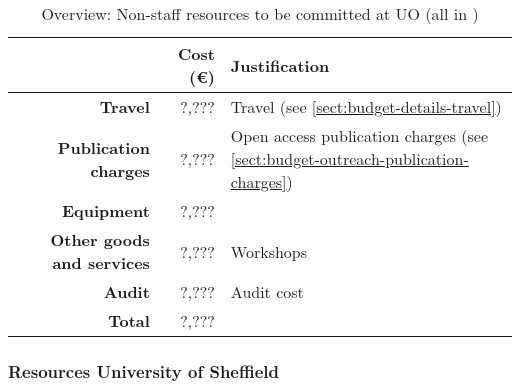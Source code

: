 \bigskip
\begin{table}[H]
\begin{tabular}{|r|r|p{9cm}|}
\hline
\textbf{} & \textbf{Cost (\euro)} & \textbf{Justification} \\\hline
\textbf{Travel} & ?,??? & Travel (see \ref{sect:budget-details-travel})\\\hline
\textbf{Publication charges} & ?,??? & Open access publication charges (see \ref{sect:budget-outreach-publication-charges})\\\hline
\textbf{Equipment} & ?,??? &  \\\hline    %

\textbf{Other goods and services} & ?,??? & Workshops \\\hline   %
\textbf{Audit} & ?,??? & Audit cost \\\hline
\textbf{Total} & ?,???\\\cline{1-2}
\end{tabular}
\caption{Overview: Non-staff resources to be committed at UO (all in \texteuro)}\vspace*{-1em}
\end{table}




\subsubsection{Resources University of Sheffield}


